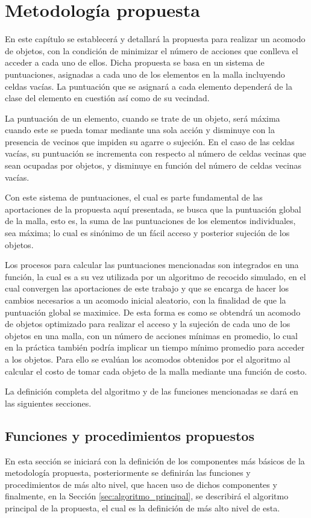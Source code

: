 \chapter{Metodología propuesta}
\label{chap:propuesta}
%
%
En este capítulo se establecerá y detallará la propuesta para realizar un acomodo de objetos, con la condición de minimizar el número de acciones que conlleva el acceder a cada uno de ellos.
Dicha propuesta se basa en un sistema de puntuaciones, asignadas a cada uno de los elementos en la malla incluyendo celdas vacías.
La puntuación que se asignará a cada elemento dependerá de la clase del elemento en cuestión así como de su vecindad.

La puntuación de un elemento, cuando se trate de un objeto, será máxima cuando este se pueda tomar mediante una sola acción y disminuye con la presencia de vecinos que impiden su agarre o sujeción.
En el caso de las celdas vacías, su puntuación se incrementa con respecto al número de celdas vecinas que sean ocupadas por objetos, y disminuye en función del número de celdas vecinas vacías.

Con este sistema de puntuaciones, el cual es parte fundamental de las aportaciones de la propuesta aquí presentada, se busca que la puntuación global de la malla, esto es, la suma de las puntuaciones de los elementos individuales, sea máxima; lo cual es sinónimo de un fácil acceso y posterior sujeción de los objetos.

Los procesos para calcular las puntuaciones mencionadas son integrados en una función, la cual es a su vez utilizada por un algoritmo de recocido simulado, en el cual convergen las aportaciones de este trabajo y que se encarga de hacer los cambios necesarios a un acomodo inicial aleatorio, con la finalidad de que la puntuación global se maximice.
De esta forma es como se obtendrá un acomodo de objetos optimizado para realizar el acceso y la sujeción de cada uno de los objetos en una malla, con un número de acciones mínimas en promedio, lo cual en la práctica también podría implicar un tiempo mínimo promedio para acceder a los objetos.
Para ello se evalúan los acomodos obtenidos por el algoritmo al calcular el costo de tomar cada objeto de la malla mediante una función de costo.

La definición completa del algoritmo y de las funciones mencionadas se dará en las siguientes secciones.
%
%
\section{Funciones y procedimientos propuestos}
\label{sec:funciones_y_procedimientos}
%
%
En esta sección se iniciará con la definición de los componentes más básicos de la metodología propuesta, posteriormente se definirán las funciones y procedimientos de más alto nivel, que hacen uso de dichos componentes y finalmente, en la Sección \ref{sec:algoritmo_principal}, se describirá el algoritmo principal de la propuesta, el cual es la definición de más alto nivel de esta.

